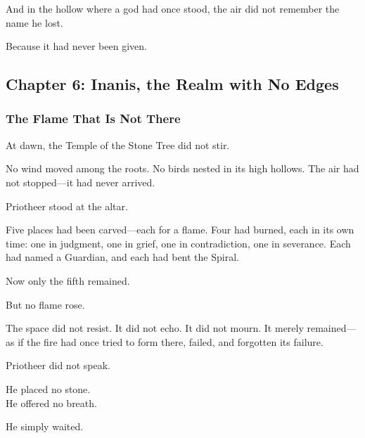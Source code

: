 \documentclass[12pt]{article}
\begin{document}
\vspace{0.5em}
And in the hollow where a god had once stood, the air did not remember the name he lost.

\vspace{0.5em}
Because it had never been given.


\newpage

\subsection*{Chapter 6: Inanis, the Realm with No Edges}

\vspace{.5in}

\subsubsection*{The Flame That Is Not There}

At dawn, the Temple of the Stone Tree did not stir.

\vspace{0.5em}
No wind moved among the roots. No birds nested in its high hollows. The air had not stopped---it had never arrived.

\vspace{0.5em}
Priotheer stood at the altar.

\vspace{0.5em}
Five places had been carved---each for a flame. Four had burned, each in its own time: one in judgment, one in grief, one in contradiction, one in severance. Each had named a Guardian, and each had bent the Spiral.

\vspace{0.5em}
Now only the fifth remained.

\vspace{0.5em}
But no flame rose.

\vspace{0.5em}
The space did not resist. It did not echo. It did not mourn. It merely remained---as if the fire had once tried to form there, failed, and forgotten its failure.

\vspace{0.5em}
Priotheer did not speak.

\vspace{0.5em}
He placed no stone.\\
He offered no breath.

\vspace{0.5em}
He simply waited.
\end{document}
